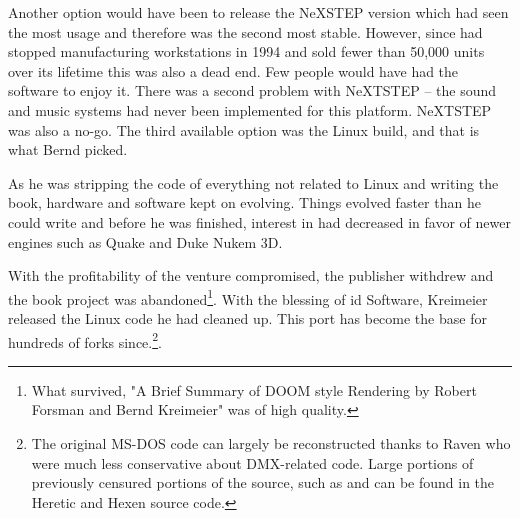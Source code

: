   \par
   Another option would have been to release the NeXSTEP version which had seen the most usage and therefore was the second most stable. However, since \NeXT had stopped manufacturing workstations in 1994 and sold fewer than 50,000 units over its lifetime this was also a dead end. Few people would have had the software to enjoy it. There was a second problem with NeXTSTEP -- the sound and music systems had never been implemented for this platform. NeXTSTEP was also a no-go. The third available option was the Linux build, and that is what Bernd picked.\\
\par
 As he was stripping the code of everything not related to Linux and writing the book, hardware and software kept on evolving. Things evolved faster than he could write and before he was finished, interest in \doom{} had decreased in favor of newer engines such as Quake and Duke Nukem 3D.\\
 \par
  With the profitability of the venture compromised, the publisher withdrew and the book project was abandoned\footnote{What survived, "A Brief Summary of DOOM style Rendering by Robert Forsman and Bernd Kreimeier" was of high quality.}. With the blessing of id Software, Kreimeier released the Linux code he had cleaned up. This port has become the base for hundreds of forks since.\footnote{The original MS-DOS code can largely be reconstructed thanks to Raven who were much less conservative about DMX-related code. Large portions of previously censured portions of the source, such as  and  can be found in the Heretic and Hexen source code.}.\\
 \par  


